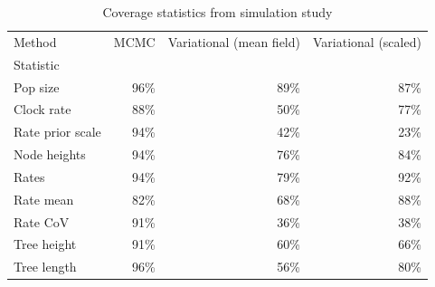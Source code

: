 \documentclass{article}
\begin{document}
\begin{table}
    \centering
    \begin{tabular}{lrrr}
\toprule
Method &  MCMC &  Variational (mean field) &  Variational (scaled) \\
Statistic        &       &                           &                       \\
\midrule
Pop size         &   96\% &                       89\% &                   87\% \\
Clock rate       &   88\% &                       50\% &                   77\% \\
Rate prior scale &   94\% &                       42\% &                   23\% \\
Node heights     &   94\% &                       76\% &                   84\% \\
Rates            &   94\% &                       79\% &                   92\% \\
Rate mean        &   82\% &                       68\% &                   88\% \\
Rate CoV         &   91\% &                       36\% &                   38\% \\
Tree height      &   91\% &                       60\% &                   66\% \\
Tree length      &   96\% &                       56\% &                   80\% \\
\bottomrule
\end{tabular}

    \caption{Coverage statistics from simulation study}
    \label{tab:coverage}
\end{table}
\end{document}
